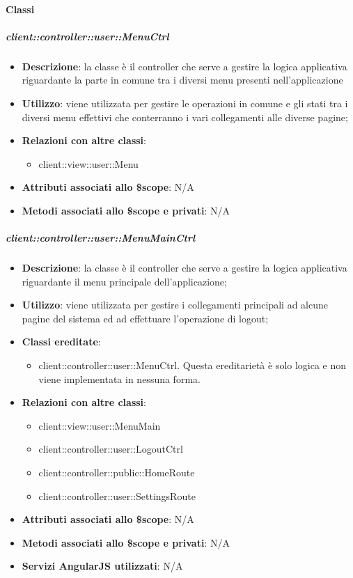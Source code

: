 	\paragraph{Classi} %
		\subparagraph{client::controller::user::MenuCtrl} %
		\label{subp:client_controller_user_menuctrl}
			\begin{itemize}
				\item \textbf{Descrizione}: la classe è il controller che serve a gestire la logica applicativa riguardante la parte in comune tra i diversi menu presenti nell'applicazione
				\item \textbf{Utilizzo}: viene utilizzata per gestire le operazioni in comune e gli stati tra i diversi menu effettivi che conterranno i vari collegamenti alle diverse pagine;
				\item \textbf{Relazioni con altre classi}:
					\begin{itemize}
						\item client::view::user::Menu
					\end{itemize}
				\item \textbf{Attributi associati allo \$scope}: N/A
				\item \textbf{Metodi associati allo \$scope e privati}: N/A
			\end{itemize}

		\subparagraph{client::controller::user::MenuMainCtrl} %
		\label{subp:client_controller_user_menumainctrl}
			\begin{itemize}
				\item \textbf{Descrizione}: la classe è il controller che serve a gestire la logica applicativa riguardante il menu principale dell'applicazione;
				\item \textbf{Utilizzo}: viene utilizzata per gestire i collegamenti principali ad alcune pagine del sistema ed ad effettuare l'operazione di logout;
				\item \textbf{Classi ereditate}:
					\begin{itemize}
						\item client::controller::user::MenuCtrl. Questa ereditarietà è solo logica e non viene implementata in nessuna forma.
					\end{itemize}
				\item \textbf{Relazioni con altre classi}:
					\begin{itemize}
						\item client::view::user::MenuMain
						\item client::controller::user::LogoutCtrl
						\item client::controller::public::HomeRoute
						\item client::controller::user::SettingsRoute
					\end{itemize}
				\item \textbf{Attributi associati allo \$scope}: N/A
				\item \textbf{Metodi associati allo \$scope e privati}: N/A
				\item \textbf{Servizi AngularJS utilizzati}: N/A
			\end{itemize}

